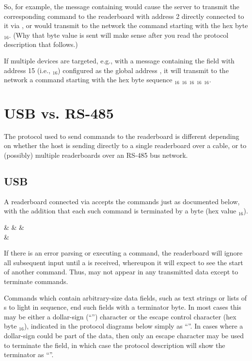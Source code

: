 So, for example, the message containing  would cause the server to transmit the corresponding command to the readerboard with address 2 directly connected to it via , or
would transmit to the  network the command starting with the hex byte $_{16}$. (Why that byte value is sent will make sense after you read the protocol
description that follows.)

If multiple devices are targeted, e.g., with a message containing the field  with address 15 (i.e., $_{16}$) configured as the global address ,
it will transmit to the  network a command starting with the hex byte sequence $_{16}$ $_{16}$ $_{16}$ $_{16}$ $_{16}$.
\section{USB vs. RS-485}
The protocol used to send commands to the readerboard is different depending on
whether the host is sending directly to a single readerboard over a 
cable, or to (possibly) multiple readerboards over an RS-485 bus network.

\subsection{USB}
A readerboard connected via  accepts the commands just as documented
below, with the addition that each such command is terminated by a 
 byte (hex value $_{16}$).
\begin{center}
\begin{bytefield}[endianness=little,bitwidth=0.11111\textwidth]{9}
	&
	&
	&
	\\
	&
\end{bytefield}
\end{center}

If there is an error parsing or executing a command, the readerboard will ignore
all subsequent input until a  is received, whereupon it will
expect to see the start of another command. Thus,  may not
appear in any transmitted data except to terminate commands.

Commands which contain arbitrary-size data fields, such as text strings or lists of
\led s to light in sequence, end such fields with a terminator byte. In most cases
this may be
either a dollar-sign (``\z{\$}'') character or the
escape control character (hex byte $_{16}$), indicated in the protocol diagrams below
simply as ``\z{\$}''. In cases where a dollar-sign could be part of the data, then
only an escape character may be used to terminate the field, in which case the protocol
description will show the terminator as ``''.
